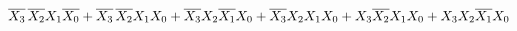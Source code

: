 \documentclass[preview]{standalone}
\begin{document}
\begin{align*}
\overline{X_3}\nobreak\hspace{.16667em plus .08333em}\overline{X_2}X_1\overline{X_0}+\overline{X_3}\nobreak\hspace{.16667em plus .08333em}\overline{X_2}X_1X_0+\overline{X_3}X_2\overline{X_1}X_0+\overline{X_3}X_2X_1X_0+X_3\overline{X_2}X_1X_0+X_3X_2\overline{X_1}X_0
\end{align*}
\end{document}
